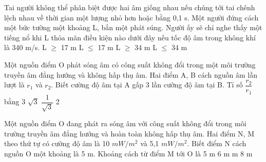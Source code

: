 \begin{ex}%
Tai người không thể phân biệt được hai âm giống nhau nếu chúng tới tai chênh lệch nhau về thời gian một lượng nhỏ hơn hoặc bằng 0,1 s. Một người đứng cách một bức tường một khoảng L, bắn một phát súng. Người ấy sẽ chỉ nghe thấy một tiếng nổ khi L thỏa mãn điều kiện nào dưới đây nếu tốc độ âm trong không khí là 340 m/s.
\choice
{L $\ge$ 17 m}
{\True L $\le$ 17 m}
{L $\ge$ 34 m}
{L $\le$ 34 m}
\end{ex} 
\begin{ex}%
Một nguồn điểm O phát sóng âm có công suất không đổi trong một môi trường truyền âm đẳng hướng và không hấp thụ âm. Hai điểm A, B cách nguồn âm lần lượt là $r_1$ và $r_2$. Biết cường độ âm tại A gấp 3 lần cường độ âm tại B. Tỉ số $\dfrac{r_2}{r_1}$ bằng
\choice
{3}
{\True $\sqrt{3}$}
{$\dfrac{1}{\sqrt{3}}$}
{2}
\end{ex} 
\begin{ex}%
Một nguồn điểm O đang phát ra sóng âm với công suất không đổi trong môi trường truyền âm đẳng hướng và hoàn toàn không hấp thụ âm. Hai điểm N, M theo thứ tự có cường độ âm là 10 $mW/m^2$ và 5,1 $mW/m^2$. Biết điểm N cách nguồn O một khoảng là 5 m. Khoảng cách từ điểm M tới O là
\choice
{5 m}
{6 m}
{ m}
{8 m}
\end{ex} 
